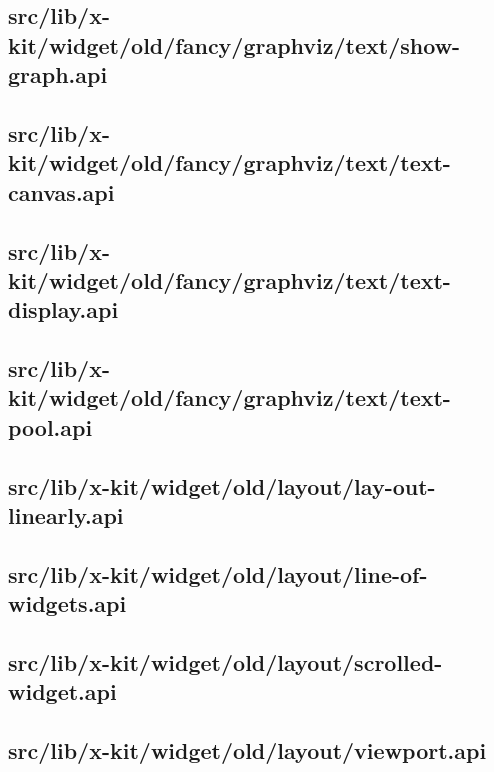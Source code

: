 \subsection{src/lib/x-kit/widget/old/fancy/graphviz/text/show-graph.api}


\subsection{src/lib/x-kit/widget/old/fancy/graphviz/text/text-canvas.api}


\subsection{src/lib/x-kit/widget/old/fancy/graphviz/text/text-display.api}


\subsection{src/lib/x-kit/widget/old/fancy/graphviz/text/text-pool.api}


\subsection{src/lib/x-kit/widget/old/layout/lay-out-linearly.api}


\subsection{src/lib/x-kit/widget/old/layout/line-of-widgets.api}


\subsection{src/lib/x-kit/widget/old/layout/scrolled-widget.api}


\subsection{src/lib/x-kit/widget/old/layout/viewport.api}


